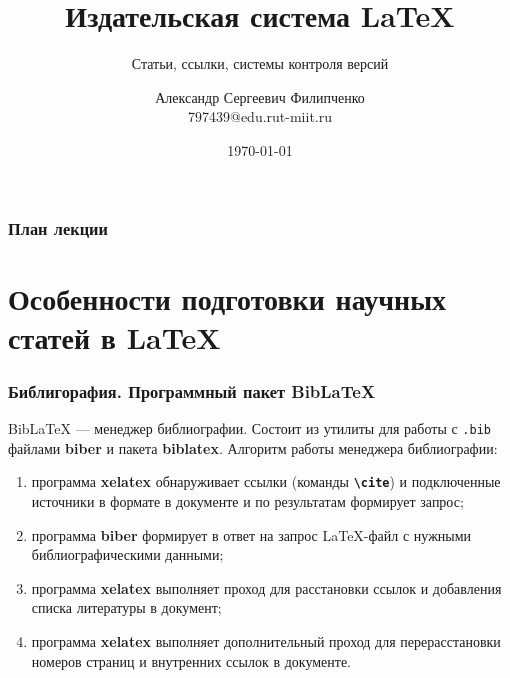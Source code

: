 \documentclass[aspectratio=169]{beamer}
\title[Заголовок]{Издательская система \LaTeX{}}
\subtitle{Статьи, ссылки, системы контроля версий}
\author[Имя автора]{Александр Сергеевич Филипченко \\ \smallskip \scriptsize 797439@edu.rut-miit.ru\\}
\institute{кафедра <<Вычислительные системы, сети и информационная безопасность>>}
\date{\today}
\begin{document}

\frame[plain]{\titlepage}	%

\begin{frame}
\frametitle{План лекции}
\tableofcontents
\end{frame}

\section{Особенности подготовки научных статей в \LaTeX{}}

\begin{frame}
\frametitle{Библигорафия. Программный пакет BibLaTeX}
BibLaTeX --- менеджер библиографии.
Состоит из утилиты для работы с \texttt{.bib} файлами \textbf{biber} и пакета \textbf{biblatex}.
Алгоритм работы менеджера библиографии:
\begin{enumerate} 
\item программа \textbf{xelatex} обнаруживает ссылки (команды \texttt{\textbf{\textbackslash cite}}) и подключенные источники в формате в документе и по результатам формирует запрос;
\item программа \textbf{biber} формирует в ответ на запрос LaTeX-файл с нужными библиографическими данными;
\item программа \textbf{xelatex} выполняет проход для расстановки ссылок и добавления списка литературы в документ;
\item программа \textbf{xelatex} выполняет дополнительный проход для перерасстановки номеров страниц и внутренних ссылок в документе.
\end{enumerate} 
\end{frame}
\end{document}
